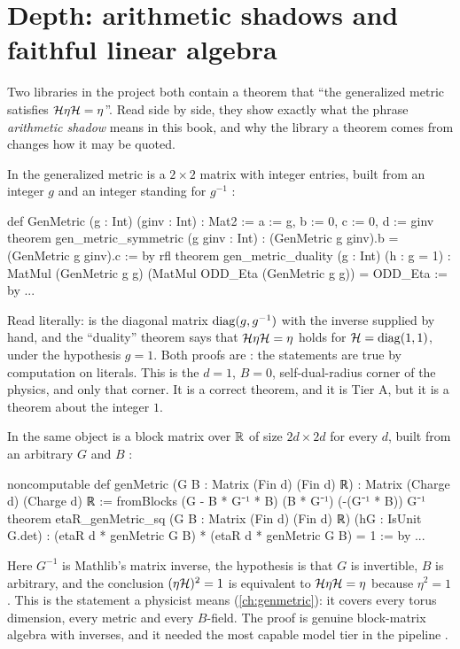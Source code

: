 \section{Depth: arithmetic shadows and faithful linear algebra}\label{sec:architecture:depth}

Two libraries in the project both contain a theorem that ``the generalized metric satisfies
$\mathcal{H}\eta\mathcal{H}=\eta$''. Read side by side, they show exactly what the phrase \emph{arithmetic
shadow} means in this book, and why the library a theorem comes
from changes how it may be quoted.

In  the generalized metric is a
$2\times2$ matrix with integer entries, built from an integer $g$ and an integer standing for
$g^{-1}$ :
\begin{leancode}
def GenMetric (g : Int) (ginv : Int) : Mat2 :=
  { a := g, b := 0, c := 0, d := ginv }
theorem gen_metric_symmetric (g ginv : Int) :
    (GenMetric g ginv).b = (GenMetric g ginv).c := by rfl
theorem gen_metric_duality (g : Int) (h : g = 1) :
    MatMul (GenMetric g g) (MatMul ODD_Eta (GenMetric g g)) = ODD_Eta := by ...
\end{leancode}
Read literally:  is the diagonal matrix $\operatorname{diag}(g,g^{-1})$ with the
inverse supplied by hand, and the ``duality'' theorem says that $\mathcal{H}\eta\mathcal{H}=\eta$ holds for
$\mathcal{H}=\operatorname{diag}(1,1)$, under the hypothesis $g=1$. Both proofs are : the statements
are true by computation on literals. This is the $d=1$, $B=0$, self-dual-radius corner of
the physics, and only that corner. It is a correct theorem, and it is Tier A, but it is a
theorem about the integer $1$.

In  the same object is a block matrix
over $\mathbb{R}$ of size $2d\times2d$ for every $d$, built from an arbitrary $G$ and $B$
:
\begin{leancode}
noncomputable def genMetric (G B : Matrix (Fin d) (Fin d) ℝ) :
    Matrix (Charge d) (Charge d) ℝ :=
  fromBlocks (G - B * G⁻¹ * B) (B * G⁻¹) (-(G⁻¹ * B)) G⁻¹
theorem etaR_genMetric_sq (G B : Matrix (Fin d) (Fin d) ℝ) (hG : IsUnit G.det) :
    (etaR d * genMetric G B) * (etaR d * genMetric G B) = 1 := by ...
\end{leancode}
Here $G^{-1}$ is Mathlib's matrix inverse, the hypothesis is that $G$ is invertible, $B$ is
arbitrary, and the conclusion $(\eta\mathcal{H})^2=1$ is equivalent to $\mathcal{H}\eta\mathcal{H}=\eta$ because
$\eta^2=1$. This is the statement a physicist means (\cref{ch:genmetric}): it covers every
torus dimension, every metric and every $B$-field. The proof is genuine block-matrix
algebra with inverses, and it needed the most capable model tier in the pipeline
.

